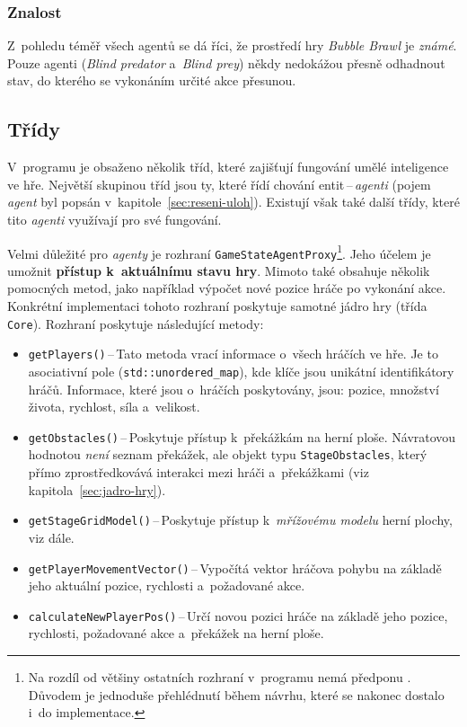 \subsubsection*{Znalost}

Z~pohledu téměř všech agentů se dá říci, že prostředí hry \emph{Bubble Brawl} je \emph{známé}. Pouze  agenti (\emph{Blind predator} a~\emph{Blind prey}) někdy nedokážou přesně odhadnout stav, do kterého se vykonáním určité akce přesunou.

\subsection{Třídy}
\label{sec:entity-rizene-pocitacem:tridy}

V~programu je obsaženo několik tříd, které zajišťují fungování umělé inteligence ve hře. Největší skupinou tříd jsou ty, které řídí chování entit\,--\,\emph{agenti} (pojem \emph{agent} byl popsán v~kapitole~\ref{sec:reseni-uloh}). Existují však také další třídy, které tito \emph{agenti} využívají pro své fungování.

Velmi důležité pro \emph{agenty} je rozhraní \texttt{GameStateAgentProxy}\footnote{Na rozdíl od většiny ostatních rozhraní v~programu nemá předponu . Důvodem je jednoduše přehlédnutí během návrhu, které se nakonec dostalo i~do implementace.}. Jeho účelem je umožnit \textbf{přístup k~aktuálnímu stavu hry}. Mimoto také obsahuje několik pomocných metod, jako například výpočet nové pozice hráče po vykonání akce. Konkrétní implementaci tohoto rozhraní poskytuje samotné jádro hry (třída \texttt{Core}). Rozhraní poskytuje následující metody:
\begin{itemize}
    \item \texttt{getPlayers()}\,--\,Tato metoda vrací informace o~všech hráčích ve hře. Je to asociativní pole (\texttt{std::unordered\_map}), kde klíče jsou unikátní identifikátory hráčů. Informace, které jsou o~hráčích poskytovány, jsou: pozice, množství života, rychlost, síla a~velikost.
    \item \texttt{getObstacles()}\,--\,Poskytuje přístup k~překážkám na herní ploše. Návratovou hodnotou \emph{není} seznam překážek, ale objekt typu \texttt{StageObstacles}, který přímo zprostředkovává interakci mezi hráči a~překážkami (viz kapitola~\ref{sec:jadro-hry}).
    \item \texttt{getStageGridModel()}\,--\,Poskytuje přístup k~\emph{mřížovému modelu} herní plochy, viz dále.
    \item \texttt{getPlayerMovementVector()}\,--\,Vypočítá vektor hráčova pohybu na základě jeho aktuální pozice, rychlosti a~požadované akce.
    \item \texttt{calculateNewPlayerPos()}\,--\,Určí novou pozici hráče na základě jeho pozice, rychlosti, požadované akce a~překážek na herní ploše.
\end{itemize}


